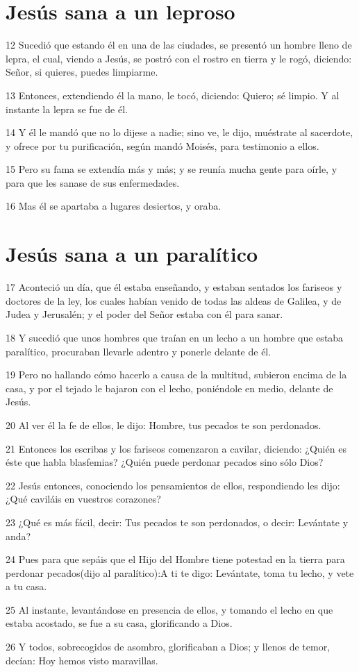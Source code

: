 \section*{Jesús sana a un leproso}

\par 12 Sucedió que estando él en una de las ciudades, se presentó un hombre lleno de lepra, el cual, viendo a Jesús, se postró con el rostro en tierra y le rogó, diciendo: Señor, si quieres, puedes limpiarme.
\par 13 Entonces, extendiendo él la mano, le tocó, diciendo: Quiero; sé limpio. Y al instante la lepra se fue de él.
\par 14 Y él le mandó que no lo dijese a nadie; sino ve, le dijo, muéstrate al sacerdote, y ofrece por tu purificación, según mandó Moisés, para testimonio a ellos.
\par 15 Pero su fama se extendía más y más; y se reunía mucha gente para oírle, y para que les sanase de sus enfermedades.
\par 16 Mas él se apartaba a lugares desiertos, y oraba.

\section*{Jesús sana a un paralítico}

\par 17 Aconteció un día, que él estaba enseñando, y estaban sentados los fariseos y doctores de la ley, los cuales habían venido de todas las aldeas de Galilea, y de Judea y Jerusalén; y el poder del Señor estaba con él para sanar.
\par 18 Y sucedió que unos hombres que traían en un lecho a un hombre que estaba paralítico, procuraban llevarle adentro y ponerle delante de él.
\par 19 Pero no hallando cómo hacerlo a causa de la multitud, subieron encima de la casa, y por el tejado le bajaron con el lecho, poniéndole en medio, delante de Jesús.
\par 20 Al ver él la fe de ellos, le dijo: Hombre, tus pecados te son perdonados.
\par 21 Entonces los escribas y los fariseos comenzaron a cavilar, diciendo: ¿Quién es éste que habla blasfemias? ¿Quién puede perdonar pecados sino sólo Dios?
\par 22 Jesús entonces, conociendo los pensamientos de ellos, respondiendo les dijo: ¿Qué caviláis en vuestros corazones?
\par 23 ¿Qué es más fácil, decir: Tus pecados te son perdonados, o decir: Levántate y anda?
\par 24 Pues para que sepáis que el Hijo del Hombre tiene potestad en la tierra para perdonar pecados(dijo al paralítico):A ti te digo: Levántate, toma tu lecho, y vete a tu casa.
\par 25 Al instante, levantándose en presencia de ellos, y tomando el lecho en que estaba acostado, se fue a su casa, glorificando a Dios.
\par 26 Y todos, sobrecogidos de asombro, glorificaban a Dios; y llenos de temor, decían: Hoy hemos visto maravillas.

